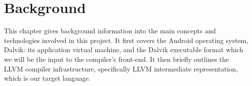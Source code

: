 \chapter{Background}
\label{chap:background}

This chapter gives background information into the main concepts and technologies involved in this project. It first covers the Android operating system, Dalvik: its application virtual machine, and the Dalvik executable format which we will be the input to the compiler's front-end. It then briefly outlines the LLVM compiler infrastructure, specifically LLVM intermediate representation, which is our target language.








